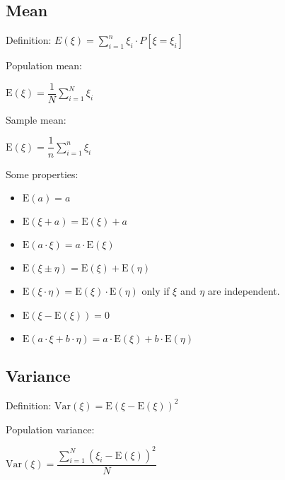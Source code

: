 \documentclass[10pt, a4paper, landscape]{article}
\newcommand{\E}{\mathrm{E}}
\newcommand{\Var}{\mathrm{Var}}
\begin{document}
\begin{multicols}{3}
		\subsection*{Mean}
		
		Definition: \quad $E(\xi) = \sum_{i=1}^{n}\xi_{i} \cdot P[\xi = \xi_{i}]$
		
		\begin{multicols}{2}
			Population mean:
			
			\begin{center}
				$\E(\xi) = \dfrac{1}{N}\sum_{i=1}^{N}\xi_{i}$
			\end{center}
			
			\columnbreak
			
			Sample mean:
			
			\begin{center}
				$\E(\xi) = \dfrac{1}{n}\sum_{i=1}^{n}\xi_{i}$
			\end{center}
		\end{multicols}
		
		Some properties:
		
		\begin{itemize}[leftmargin=*]
			\item $\E(a) = a$
			\item $\E(\xi + a) = \E(\xi) + a$
			\item $\E(a \cdot \xi) = a \cdot \E(\xi)$
			\item $\E(\xi \pm \eta) = \E(\xi) + \E(\eta)$
			\item $\E(\xi \cdot \eta) = \E(\xi) \cdot \E(\eta)$ \quad only if $\xi$ and $\eta$ are independent.
			\item $\E(\xi - \E(\xi)) = 0$
			\item $\E(a \cdot \xi + b \cdot \eta) = a \cdot \E(\xi) + b \cdot \E(\eta)$
		\end{itemize}
		
		\subsection*{Variance}
		
		Definition: \quad $\Var(\xi) = \E(\xi - \E(\xi))^{2}$
		
		\begin{multicols}{2}
			Population variance:
			
			\begin{center}
				$\Var(\xi) = \dfrac{\sum_{i=1}^{N} (\xi_{i} - \E(\xi))^2}{N}$
			\end{center}
			

\end{multicols}
\end{multicols}
\end{document}
